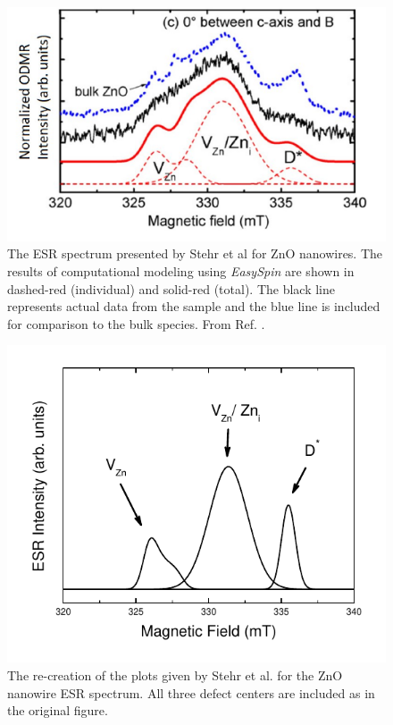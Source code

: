 \documentclass[oneside]{BYUPhys}
\begin{document}
\begin{figure}[h]
    \centerline{\includegraphics{stehr_fig}}
    \caption[ESR Spectrum Presented by Stehr et al.]{\label{fig:StehrPlots}
     The ESR spectrum presented by Stehr et al for ZnO nanowires. The results of computational modeling using \textit{EasySpin} are shown in dashed-red (individual) and solid-red (total). The black line represents actual data from the sample and the blue line is included for comparison to the bulk species. From Ref. .}
 \end{figure}

\begin{figure}[h]
    \centerline{\includegraphics{stehr_rec_fig}}
    \caption[Recreation of ZnO Nanowire ESR]{\label{fig:StehrRec}
     The re-creation of the plots given by Stehr et al. for the ZnO nanowire ESR spectrum. All three defect centers are included as in the original figure. }
 \end{figure}
 
\end{document}
